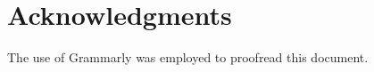 \section*{Acknowledgments} \label{section: acknowledgments}
The use of Grammarly was employed to proofread this document.

